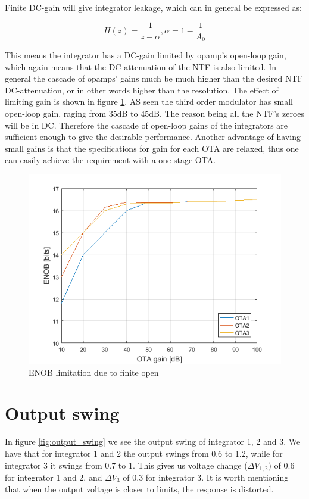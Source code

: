 Finite DC-gain will give integrator leakage, which can in general be expressed as:

\begin{equation}
    H(z) = \frac{1}{z - \alpha}, \alpha = 1 - \frac{1}{A_0}
\end{equation}

This means the integrator has a DC-gain limited by opamp's open-loop gain, which again means that the DC-attenuation of the NTF is also limited. In general the cascade of opamps' gains much be much higher than the desired NTF DC-attenuation, or in other words higher than the resolution. The effect of limiting gain is shown in figure \ref{fig:DC_gain_spec}. AS seen the third order modulator has small open-loop gain, raging from 35dB to 45dB. The reason being all the NTF's zeroes will be in DC. Therefore the cascade of open-loop gains of the integrators are sufficient enough to give the desirable performance. Another advantage of having small gains is that the specifications for gain for each OTA are relaxed, thus one can easily achieve the requirement with a one stage OTA. 

\begin{figure}[H]
\centering
\includegraphics[scale=0.7]{images/DC_gain_spec.png}
\caption{ENOB limitation due to finite open}
\label{fig:DC_gain_spec}
\end{figure}

\section{Output swing}\label{out_put_swing}
In figure \ref{fig:output_swing} we see the output swing of integrator 1, 2 and 3. We have that for integrator 1 and 2 the output swings from 0.6 to 1.2, while for integrator 3 it swings from 0.7 to 1. This gives us voltage change ($\Delta V_{1,2}$) of 0.6 for integrator 1 and 2, and $\Delta V_3$ of 0.3 for integrator 3. It is worth mentioning that when the output voltage is closer to limits, the response is distorted.    

